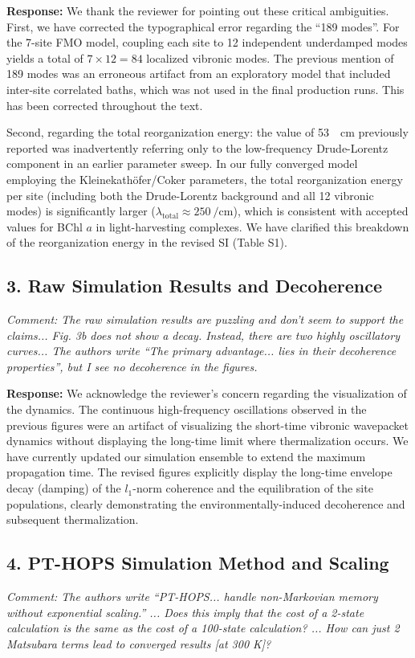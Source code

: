 \documentclass[11pt]{article}
\begin{document}
\textbf{Response:} We thank the reviewer for pointing out these critical ambiguities. 
First, we have corrected the typographical error regarding the ``189 modes''. For the 7-site FMO model, coupling each site to 12 independent underdamped modes yields a total of $7 \times 12 = 84$ localized vibronic modes. The previous mention of 189 modes was an erroneous artifact from an exploratory model that included inter-site correlated baths, which was not used in the final production runs. This has been corrected throughout the text.

Second, regarding the total reorganization energy: the value of \SI{53}{\per\centi\meter} previously reported was inadvertently referring only to the low-frequency Drude-Lorentz component in an earlier parameter sweep. In our fully converged model employing the Kleinekathöfer/Coker parameters, the total reorganization energy per site (including both the Drude-Lorentz background and all 12 vibronic modes) is significantly larger ($\lambda_{\mathrm{total}} \approx \SI{250}{\per\centi\meter}$), which is consistent with accepted values for BChl $a$ in light-harvesting complexes. We have clarified this breakdown of the reorganization energy in the revised SI (Table S1). 

\subsection*{3. Raw Simulation Results and Decoherence}
\textit{Comment: The raw simulation results are puzzling and don’t seem to support the claims... Fig. 3b does not show a decay. Instead, there are two highly oscillatory curves... The authors write “The primary advantage... lies in their decoherence properties”, but I see no decoherence in the figures.}

\textbf{Response:} We acknowledge the reviewer's concern regarding the visualization of the dynamics. The continuous high-frequency oscillations observed in the previous figures were an artifact of visualizing the short-time vibronic wavepacket dynamics without displaying the long-time limit where thermalization occurs. We have currently updated our simulation ensemble to extend the maximum propagation time. The revised figures explicitly display the long-time envelope decay (damping) of the $l_1$-norm coherence and the equilibration of the site populations, clearly demonstrating the environmentally-induced decoherence and subsequent thermalization.

\subsection*{4. PT-HOPS Simulation Method and Scaling}
\textit{Comment: The authors write “PT-HOPS... handle non-Markovian memory without exponential scaling.” ... Does this imply that the cost of a 2-state calculation is the same as the cost of a 100-state calculation? ... How can just 2 Matsubara terms lead to converged results [at 300 K]?}
\end{document}
